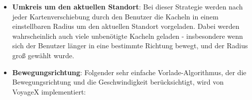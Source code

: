 \begin{itemize}[leftmargin=*,noitemsep,topsep=1ex,parsep=0pt,partopsep=0pt]
	\item \textbf{Umkreis um den aktuellen Standort}: Bei dieser Strategie werden nach jeder Kartenverschiebung durch den Benutzer die Kacheln in einem einstellbaren Radius um den aktuellen Standort vorgeladen. Dabei werden wahrscheinlich auch viele unbenötigte Kacheln geladen - insbesondere wenn sich der Benutzer länger in eine bestimmte Richtung bewegt, und der Radius groß gewählt wurde.
	\item \textbf{Bewegungsrichtung}: Folgender sehr einfache Vorlade-Algorithmus, der die Bewegungsrichtung und die Geschwindigkeit berücksichtigt, wird von VoyageX implementiert:
	\begin{itemize}[leftmargin=*,noitemsep,topsep=1ex,parsep=0pt,partopsep=0pt]

\end{itemize}
\end{itemize}
